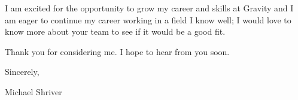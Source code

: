 \documentclass[10pt,oneside]{article}
\begin{document}
\vspace{\baselineskip}

I am excited for the opportunity to grow my career and skills at Gravity and I am eager to continue my career working in a field I know well; I would love to know more about your team to see if it would be a good fit.

\vspace{\baselineskip}

Thank you for considering me. I hope to hear from you soon.

\vspace{\baselineskip}

Sincerely,

\vspace{\baselineskip}

Michael Shriver
\end{document}
